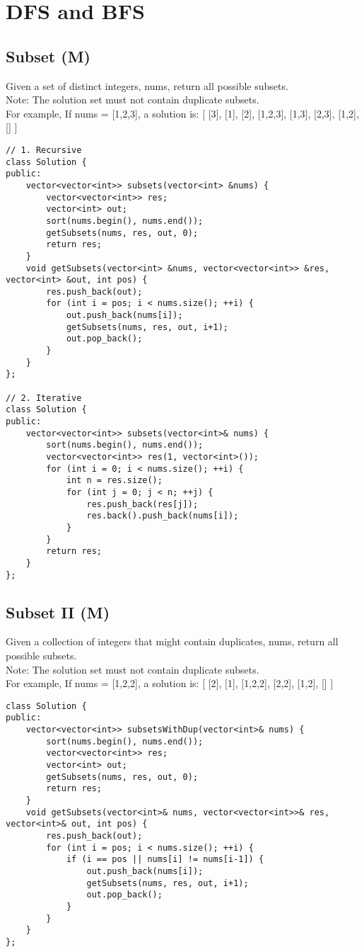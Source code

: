 \chapter{DFS and BFS}
\section{Subset (M)}
Given a set of distinct integers, nums, return all possible subsets.\\
Note: The solution set must not contain duplicate subsets.\\
For example,
If nums = [1,2,3], a solution is:
[
  [3],
  [1],
  [2],
  [1,2,3],
  [1,3],
  [2,3],
  [1,2],
  []
]\\

\begin{lstlisting}
// 1. Recursive
class Solution {
public:
    vector<vector<int>> subsets(vector<int> &nums) {
        vector<vector<int>> res;
        vector<int> out;
        sort(nums.begin(), nums.end());
        getSubsets(nums, res, out, 0);
        return res;
    }
    void getSubsets(vector<int> &nums, vector<vector<int>> &res, vector<int> &out, int pos) {
        res.push_back(out);
        for (int i = pos; i < nums.size(); ++i) {
            out.push_back(nums[i]);
            getSubsets(nums, res, out, i+1);
            out.pop_back();
        }
    }
};

// 2. Iterative
class Solution {
public:
    vector<vector<int>> subsets(vector<int>& nums) {
        sort(nums.begin(), nums.end());
        vector<vector<int>> res(1, vector<int>());
        for (int i = 0; i < nums.size(); ++i) {
            int n = res.size();
            for (int j = 0; j < n; ++j) {
                res.push_back(res[j]);
                res.back().push_back(nums[i]);
            }
        }
        return res;
    }
};
\end{lstlisting}


\section{Subset II (M)}
Given a collection of integers that might contain duplicates, nums, return all possible subsets.\\
Note: The solution set must not contain duplicate subsets.\\
For example,
If nums = [1,2,2], a solution is:
[
  [2],
  [1],
  [1,2,2],
  [2,2],
  [1,2],
  []
]\\

\begin{lstlisting}
class Solution {
public:
    vector<vector<int>> subsetsWithDup(vector<int>& nums) {
        sort(nums.begin(), nums.end());
        vector<vector<int>> res;
        vector<int> out;
        getSubsets(nums, res, out, 0);
        return res;
    }
    void getSubsets(vector<int>& nums, vector<vector<int>>& res, vector<int>& out, int pos) {
        res.push_back(out);
        for (int i = pos; i < nums.size(); ++i) {
            if (i == pos || nums[i] != nums[i-1]) {
                out.push_back(nums[i]);
                getSubsets(nums, res, out, i+1);
                out.pop_back();
            }
        }
    }
};
\end{lstlisting}


